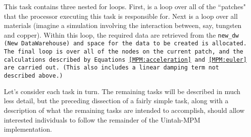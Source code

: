 This task contains three nested for loops.  First, is a loop over all of the
``patches" that the processor executing this task is responsible for.  Next
is a loop over all materials (imagine a simulation involving the interaction
between, say, tungsten and copper).  Within this loop, the required data
are retrieved from the \tt new\_dw \normalfont (New DataWarehouse) and space for the data
to be created is allocated.  The final loop is over all of the nodes on
the current patch, and the calculations described by
Equations~\ref{MPM:acceleration} and~\ref{MPM:euler} are carried out.  (This
also includes a linear damping term not described above.)

Let's consider each task in turn.  The remaining tasks will be described
in much less detail, but the preceding dissection of a fairly simple task,
along with a description of what the remaining tasks are intended to 
accomplish, should allow interested individuals to follow the remainder
of the Uintah-MPM implementation.

